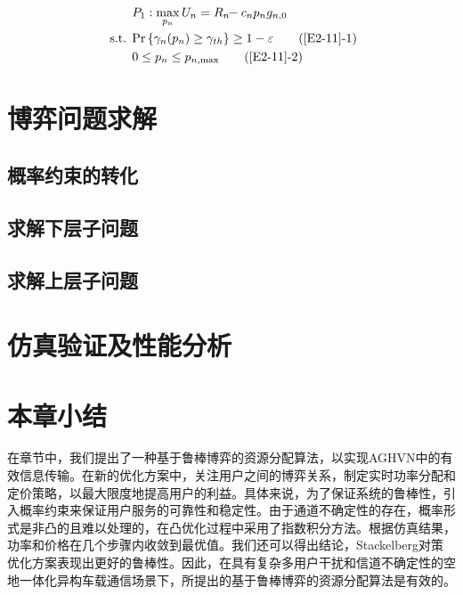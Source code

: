 \begin{align}
&P_1: \max\limits_{p_{n}} U_{n}=R_{n}\!\!-c_{n} p_n g_{n,0}                \label{E2-11}\\
\text { s.t. }
& \textrm{Pr}\left\{\gamma_{n}(p_n) \geq \gamma_{th}\right\}\geq1-\varepsilon           \tag{\ref{E2-11}{-1}}      \label{E2-11-1}\\  %
& 0\leq p_n\leq p_{n,\textrm{max}}                           \tag{\ref{E2-11}{-2}}      \label{E2-11-2}  %
\end{align}
\section{博弈问题求解}\label{section2-3}
\subsection{概率约束的转化}\label{section2-3-1}
\subsection{求解下层子问题}\label{section2-3-2}
\subsection{求解上层子问题}\label{section2-3-3}
\section{仿真验证及性能分析}\label{section2-4}

\section{本章小结}\label{section2-5}
在章节中，我们提出了一种基于鲁棒博弈的资源分配算法，以实现AGHVN中的有效信息传输。在新的优化方案中，关注用户之间的博弈关系，制定实时功率分配和定价策略，以最大限度地提高用户的利益。具体来说，为了保证系统的鲁棒性，引入概率约束来保证用户服务的可靠性和稳定性。由于通道不确定性的存在，概率形式是非凸的且难以处理的，在凸优化过程中采用了指数积分方法。根据仿真结果，功率和价格在几个步骤内收敛到最优值。我们还可以得出结论，Stackelberg对策优化方案表现出更好的鲁棒性。因此，在具有复杂多用户干扰和信道不确定性的空地一体化异构车载通信场景下，所提出的基于鲁棒博弈的资源分配算法是有效的。


